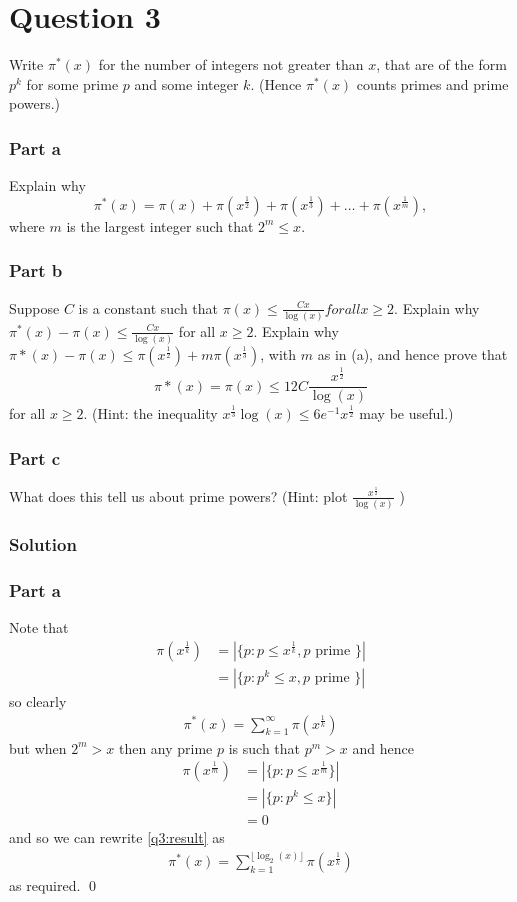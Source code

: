 \documentclass{unswmaths}
\begin{document}
\section*{Question 3}
Write $ \pi^*(x) $ for the number of integers not greater than $ x$, that are of the form $ p^k $ for some prime $ p $ and some integer $ k $. (Hence $ \pi^*(x) $ counts primes
and prime powers.)
\subsubsection*{Part a}
Explain why
$$
	\pi^*(x) = \pi(x) + \pi(x^\frac{1}{2}) + \pi(x^\frac{1}{3}) + \ldots + \pi(x^\frac{1}{m}), 
$$
where $ m $ is the largest integer such that $ 2^m \leq x $.
\subsubsection*{Part b}
Suppose $ C $ is a constant such that $ \pi(x) \leq \frac{Cx}{\log(x)} for all  x \geq 2 $.
Explain why $ \pi^*(x) - \pi(x) \leq \frac{Cx}{\log(x)} $ for all $ x \geq 2 $.
Explain why $ \pi*(x) - \pi(x) \leq \pi(x^\frac{1}{2}) + m\pi(x^\frac{1}{3})$, with $ m $ as in (a), and hence
prove that 
$$
	\pi*(x) = \pi(x) \leq 12C\frac{x^\frac{1}{2}}{\log(x)}
$$
for all $ x \geq 2 $. (Hint: the inequality $x^\frac{1}{3}\log(x) \leq 6e^{-1}x^\frac{1}{2}$ may be useful.)
\subsubsection*{Part c}
What does this tell us about prime powers? (Hint: plot $ \frac{x^\frac{1}{2}}{\log(x)} $ )
\subsubsection*{Solution}
\subsubsection*{Part a}
Note that 
\begin{align*}
	\pi(x^\frac{1}{k}) &= | \{ p : p \leq x^\frac{1}{k}, p \text{ prime } \} | \\
		&= | \{ p : p^k \leq x, p \text{ prime } \} |
\end{align*}
so clearly 
\begin{align}
	\label{q3:result}
	\pi^*(x) = \sum_{k=1}^\infty \pi(x^\frac{1}{k}) 
\end{align}
but when $ 2^m > x $ then any prime $ p $ is such that $ p^m > x $ and hence 
\begin{align*}
	\pi(x^\frac{1}{m}) &= | \{ p : p \leq x^\frac{1}{m} \} | \\
		&= | \{ p : p^k \leq x \} | \\
		&= 0
\end{align*}
and so we can rewrite \ref{q3:result} as 
\begin{align*}
	\pi^*(x) = \sum_{k=1}^{\lfloor \log_2(x) \rfloor} \pi(x^\frac{1}{k})
\end{align*}
as required.
\qed
\end{document}
